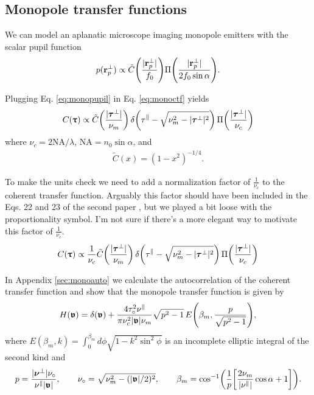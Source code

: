 \documentclass[]{osa-article}
\let\originalleft\left
\let\originalright\right
\renewcommand{\left}{\mathopen{}\mathclose\bgroup\originalleft}
\renewcommand{\right}{\aftergroup\egroup\originalright}
\newcommand{\mypar}{\parallel}
\providecommand{\rpperp}{\mathbf{r}_p^{\bot}}
\providecommand{\bs}[1]{\boldsymbol{#1}}
\providecommand{\bv}{\boldsymbol{\mathfrak{v}}}
\providecommand{\bvperp}{\bs{\nu}^{\bot}}
\providecommand{\bvpar}{\nu^{\parallel}}
\providecommand{\bt}{\bs{\uptau}}
\providecommand{\btperp}{\bs{\tau}^{\bot}}
\providecommand{\btpar}{\tau^{\mypar}}
\providecommand{\add}[1]{{\color{blue}#1}}
\begin{document}
\subsection{Monopole transfer functions}
We can model an aplanatic microscope imaging monopole emitters with the scalar pupil function
\begin{align}
  p(\rpperp) \propto  \tilde{C}\left(\frac{|\rpperp|}{f_0}\right)\Pi\left(\frac{|\rpperp|}{2f_0\sin\alpha}\right). \label{eq:monopupil}
\end{align}

Plugging Eq. \eqref{eq:monopupil} in Eq. \eqref{eq:monoctf} yields
\begin{align}
  C(\bt) \propto \tilde{C}\left(\frac{|\btperp|}{\nu_m}\right)\,\delta\left(\btpar - \sqrt{\nu_m^2 - |\btperp|^2}\right)\,\Pi\left(\frac{|\btperp|}{\nu_c}\right)
\end{align}
where $\nu_c = 2\text{NA}/\lambda$, $\text{NA} = n_0\sin\alpha$, and 
\begin{align}
  \tilde{C}(x) = (1 - x^2)^{-1/4}.
\end{align}

\add{To make the units check we need to add a normalization factor of $\frac{1}{\nu_c}$ to the coherent transfer function. Arguably this factor should have been included in the Eqs. 22 and 23 of the second paper \cite{chandler2019b}, but we played a bit loose with the proportionality symbol. I'm not sure if there's a more elegant way to motivate this factor of $\frac{1}{\nu_c}$.}
\begin{align}
  C(\bt) \propto \frac{1}{\nu_c}\tilde{C}\left(\frac{|\btperp|}{\nu_m}\right)\,\delta\left(\btpar - \sqrt{\nu_m^2 - |\btperp|^2}\right)\,\Pi\left(\frac{|\btperp|}{\nu_c}\right)
\end{align}

In Appendix \ref{sec:monoauto} we calculate the autocorrelation of the coherent transfer function and show that the monopole transfer function is given by
\begin{align}
  H(\bv) = \delta(\bv) + \frac{4\tau_{\circ}^2\bvpar}{\pi\nu_c^2|\bv|\nu_m}\sqrt{p^2 - 1}\,E\left(\beta_m, \frac{p}{\sqrt{p^2 - 1}}\right),
\end{align}
where $E(\beta_m, k)  = \int_0^{\beta_m} d\phi\sqrt{1 - k^2\sin^2\phi}$ is an incomplete elliptic integral of the second kind and
\begin{align}
  p = \frac{|\bvperp|\nu_\circ}{\bvpar|\bv|},\qquad
  \nu_\circ = \sqrt{\nu_m^2 - (|\bv|/2)^2},\qquad
  \beta_m = \cos^{-1}\left(\frac{1}{p}\left[\frac{2\nu_m}{|\bvpar|}\cos\alpha + 1\right]\right).
\end{align}
\end{document}
